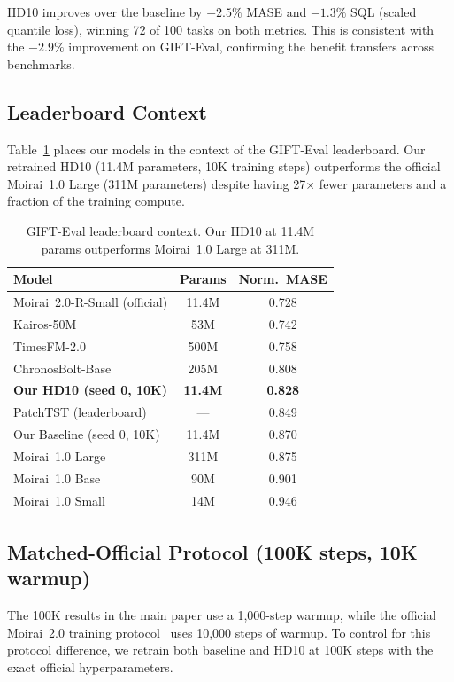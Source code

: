 \documentclass[11pt]{article}
\begin{document}
HD10 improves over the baseline by $-2.5\%$ MASE and $-1.3\%$ SQL (scaled quantile loss), winning 72 of 100 tasks on both metrics. This is consistent with the $-2.9\%$ improvement on GIFT-Eval, confirming the benefit transfers across benchmarks.

\subsection{Leaderboard Context}

Table~\ref{tab:leaderboard} places our models in the context of the GIFT-Eval leaderboard. Our retrained HD10 (11.4M parameters, 10K training steps) outperforms the official Moirai~1.0 Large (311M parameters) despite having 27$\times$ fewer parameters and a fraction of the training compute.

\begin{table}[h]
\centering
\caption{GIFT-Eval leaderboard context. Our HD10 at 11.4M params outperforms Moirai~1.0 Large at 311M.}
\label{tab:leaderboard}
\small
\begin{tabular}{lcc}
\toprule
\textbf{Model} & \textbf{Params} & \textbf{Norm.\ MASE} \\
\midrule
Moirai~2.0-R-Small (official) & 11.4M & 0.728 \\
Kairos-50M & 53M & 0.742 \\
TimesFM-2.0 & 500M & 0.758 \\
ChronosBolt-Base & 205M & 0.808 \\
\textbf{Our HD10 (seed 0, 10K)} & \textbf{11.4M} & \textbf{0.828} \\
PatchTST (leaderboard) & --- & 0.849 \\
Our Baseline (seed 0, 10K) & 11.4M & 0.870 \\
Moirai~1.0 Large & 311M & 0.875 \\
Moirai~1.0 Base & 90M & 0.901 \\
Moirai~1.0 Small & 14M & 0.946 \\
\bottomrule
\end{tabular}
\end{table}

\subsection{Matched-Official Protocol (100K steps, 10K warmup)}

The 100K results in the main paper use a 1,000-step warmup, while the official Moirai~2.0 training protocol~\citep{liu2024moirai2} uses 10,000 steps of warmup. To control for this protocol difference, we retrain both baseline and HD10 at 100K steps with the exact official hyperparameters.
\end{document}
